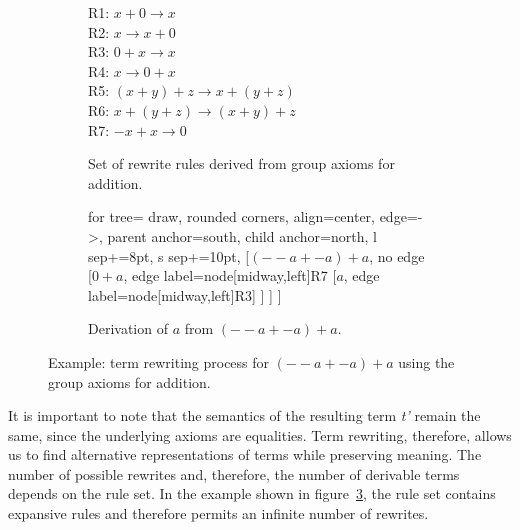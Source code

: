 \begin{figure}[h]
	\centering
	\begin{subfigure}[c]{0.55\textwidth}
		\vspace*{\fill} %
		\raggedright
		R1: $x + 0 \rightarrow x$\\
		R2: $x \rightarrow x + 0$\\
		R3: $0 + x \rightarrow x$\\
		R4: $x \rightarrow 0 + x$\\
		R5: $(x + y) + z \rightarrow x + (y + z)$\\
		R6: $x + (y + z) \rightarrow (x + y) + z$\\
		R7: $-x + x \rightarrow 0$
		\vspace*{\fill}
		\caption{\scriptsize Set of rewrite rules derived from group axioms for addition.}
		\label{fig:term-rewriting-rules}
	\end{subfigure}
	\hfill
	\begin{subfigure}[c]{0.4\textwidth}
		\centering
		\begin{forest}
			for tree={
				draw,
				rounded corners,
				align=center,
				edge={->},
				parent anchor=south,
				child anchor=north,
				l sep+=8pt,
				s sep+=10pt,
			}
			[$(--a + -a) + a$, no edge
			[$0 + a$, edge label={node[midway,left]{R7}}
			[$a$, edge label={node[midway,left]{R3}}]
			]
			]
			]
		\end{forest}
		\caption{\scriptsize Derivation of $a$ from $(--a + -a) + a$.}
		\label{fig:term-rewriting-tree}
	\end{subfigure}
	
	\caption{Example: term rewriting process for $(--a + -a) + a$ using the group axioms for addition.}
	\label{fig:term-rewriting-example}
\end{figure}

It is important to note that the semantics of the resulting term \emph{t'} remain the same, since the underlying axioms are equalities. Term rewriting, therefore, allows us to find alternative representations of terms while preserving meaning. The number of possible rewrites and, therefore, the number of derivable terms depends on the rule set. In the example shown in figure~\ref{fig:term-rewriting-example}, the rule set contains expansive rules and therefore permits an infinite number of rewrites.


